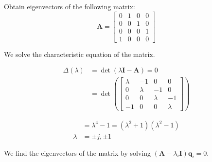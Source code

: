 \item Obtain eigenvectors of the following matrix:
\begin{equation*}
 \mathbf{A} = \begin{bmatrix}
0 & 1 & 0 & 0\\
0 & 0 & 1 & 0\\
0 & 0 & 0 & 1\\
1 & 0 & 0 & 0
     \end{bmatrix}
\end{equation*}

We solve the characteristic equation of the matrix.

\begin{align*}
 \Delta(\lambda) &= \det(\lambda \mathbf{I} - \mathbf{A}) = 0\\
 &= \det \left(
 \begin{bmatrix}
  \lambda & -1 & 0 & 0\\
  0 & \lambda & -1 & 0\\
  0 & 0 & \lambda & -1\\
  -1 & 0 & 0 & \lambda
 \end{bmatrix}
 \right)
\end{align*}

\begin{align*}
 &= \lambda^4 -1 = (\lambda^2 +1)(\lambda^2 -1)\\
\lambda &= \pm j, \pm 1
\end{align*}

We find the eigenvectors of the matrix by solving
$(\mathbf{A} - \lambda_i \mathbf{I})\mathbf{q}_i = 0$.

